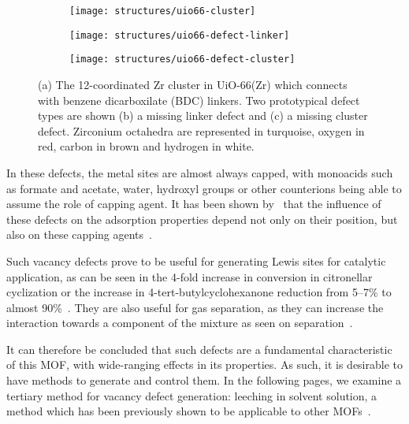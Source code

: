 \begin{figure}[htb]
	\centering

	\begin{subfigure}{0.3\linewidth}
		\parbox[c]{0.15\linewidth}{\caption{}%
			\label{defects:fgr:uio66-cluster}}%
		\parbox[b]{0.85\linewidth}{%
			\texttt{[image: structures/uio66-cluster]}%
		}%
	\end{subfigure}
	\begin{subfigure}{0.3\linewidth}
		\parbox[c]{0.15\linewidth}{\caption{}%
			\label{defects:fgr:uio66-defect-linker}}%
		\parbox[b]{0.85\linewidth}{%
			\texttt{[image: structures/uio66-defect-linker]}%
		}%
	\end{subfigure}
	\begin{subfigure}{0.3\linewidth}
		\parbox[c]{0.15\linewidth}{\caption{}%
			\label{defects:fgr:uio66-defect-cluster}}%
		\parbox[b]{0.85\linewidth}{%
			\texttt{[image: structures/uio66-defect-cluster]}%
		}%
	\end{subfigure}

	\caption{(a) The 12-coordinated Zr cluster in UiO-66(Zr)
		which connects with benzene dicarboxilate (BDC) linkers.
		Two prototypical defect types are shown (b) a missing
		linker defect and (c) a missing cluster defect. Zirconium
		octahedra are represented in turquoise, oxygen in red,
		carbon in brown and hydrogen in white.}%
	\label{defects:fgr:uio66}

\end{figure}

In these defects, the metal sites are almost always capped,
with monoacids such as formate and acetate, water, hydroxyl groups
or other counterions being able
to assume the role of capping agent. It has been shown
by~\citeauthor{thorntonDefectsMetalOrganic2016} that the influence
of these defects on the adsorption properties depend not only
on their position, but also on these capping
agents~\cite{thorntonDefectsMetalOrganic2016}. 

Such vacancy defects prove to be useful for generating Lewis
sites for catalytic application, as can be seen in the 
4-fold increase in conversion in citronellar cyclization or
the increase in 4-tert-butylcyclohexanone reduction from 
5--7\% to almost 90\%~\cite{vermoorteleSynthesisModulationTool2013}.
They are also useful for gas separation, as they can increase the 
interaction towards a component of the mixture as seen 
on  separation~\cite{thorntonDefectsMetalOrganic2016}.

It can therefore be concluded that such defects are a fundamental 
characteristic of this MOF, with wide-ranging effects in its 
properties.
As such, it is desirable to have methods to generate and control
them. In the following pages, we examine a tertiary method 
for vacancy defect generation: leeching in solvent
solution, a method which has been previously shown to be applicable 
to other MOFs~\cite{tuOrderedVacanciesTheir2014}.

